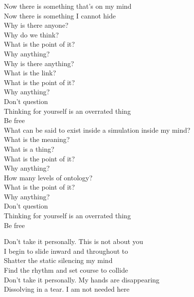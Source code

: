 Now there is something that's on my mind \\
Now there is something I cannot hide \\
Why is there anyone? \\
Why do we think? \\
What is the point of it? \\
Why anything? \\
Why is there anything? \\
What is the link? \\
What is the point of it? \\
Why anything? \\

Don't question \\
Thinking for yourself is an overrated thing \\
Be free \\

What can be said to exist inside a simulation inside my mind? \\
What is the meaning? \\
What is a thing? \\
What is the point of it? \\
Why anything? \\
How many levels of ontology? \\
What is the point of it? \\
Why anything? \\

Don't question \\
Thinking for yourself is an overrated thing \\
Be free \\




Don't take it personally. This is not about you \\
I begin to slide inward and throughout to \\
Shatter the static silencing my mind \\
Find the rhythm and set course to collide \\

Don't take it personally. My hands are disappearing \\
Dissolving in a tear. I am not needed here \\

